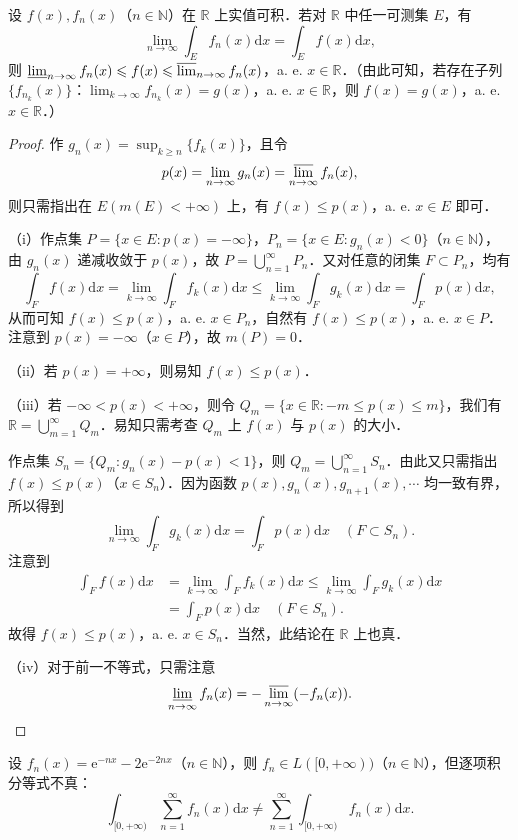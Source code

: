 \documentclass[../../main.tex]{subfiles}
\begin{document}
\begin{example}
设 \( f(x), f_n(x) \)（\( n \in \mathbb{N} \)）在 \( \mathbb{R} \) 上实值可积．若对 \( \mathbb{R} \) 中任一可测集 \( E \)，有
\[
\lim_{n \to \infty} \int_E f_n(x) \mathrm{d}x = \int_E f(x) \mathrm{d}x,
\]
则 \( \varliminf_{n \to \infty} f_n(x) \leqslant f(x) \leqslant \varlimsup_{n \to \infty} f_n(x) \)，a. e. \( x \in \mathbb{R} \)．（由此可知，若存在子列 \( \{ f_{n_k}(x) \} \)：\( \lim_{k \to \infty} f_{n_k}(x) = g(x) \)，a. e. \( x \in \mathbb{R} \)，则 \( f(x) = g(x) \)，a. e. \( x \in \mathbb{R} \)．）
\end{example}
\begin{proof}
作 \( g_n(x) = \sup_{k \geqslant n} \{ f_k(x) \} \)，且令
\[
p(x) = \lim_{n \to \infty} g_n(x) = \varlimsup_{n \to \infty} f_n(x),
\]
则只需指出在 \( E(m(E) < +\infty) \) 上，有 \( f(x) \leqslant p(x) \)，a. e. \( x \in E \) 即可．

（i）作点集 \( P = \{ x \in E : p(x) = -\infty \} \)，\( P_n = \{ x \in E : g_n(x) < 0 \} \)（\( n \in \mathbb{N} \)），由 \( g_n(x) \) 递减收敛于 \( p(x) \)，故 \( P = \bigcup_{n=1}^{\infty} P_n \)．又对任意的闭集 \( F \subset P_n \)，均有
\[
\int_F f(x) \mathrm{d}x = \lim_{k \to \infty} \int_F f_k(x) \mathrm{d}x \leqslant \lim_{k \to \infty} \int_F g_k(x) \mathrm{d}x = \int_F p(x) \mathrm{d}x,
\]
从而可知 \( f(x) \leqslant p(x) \)，a. e. \( x \in P_n \)，自然有 \( f(x) \leqslant p(x) \)，a. e. \( x \in P \)．注意到 \( p(x) = -\infty \)（\( x \in P \)），故 \( m(P) = 0 \)．

（ii）若 \( p(x) = +\infty \)，则易知 \( f(x) \leqslant p(x) \)．

（iii）若 \( -\infty < p(x) < +\infty \)，则令 \( Q_m = \{ x \in \mathbb{R} : -m \leqslant p(x) \leqslant m \} \)，我们有 \( \mathbb{R} = \bigcup_{m=1}^{\infty} Q_m \)．易知只需考查 \( Q_m \) 上 \( f(x) \) 与 \( p(x) \) 的大小．

作点集 \( S_n = \{ Q_m : g_n(x) - p(x) < 1 \} \)，则 \( Q_m = \bigcup_{n=1}^{\infty} S_n \)．由此又只需指出 \( f(x) \leqslant p(x) \)（\( x \in S_n \)）．因为函数 \( p(x), g_n(x), g_{n+1}(x), \cdots \) 均一致有界，所以得到
\[
\lim_{n \to \infty} \int_F g_k(x) \mathrm{d}x = \int_F p(x) \mathrm{d}x \quad (F \subset S_n).
\]
注意到
\begin{align*}
\int_F f(x) \mathrm{d}x &= \lim_{k \to \infty} \int_F f_k(x) \mathrm{d}x \leqslant \lim_{k \to \infty} \int_F g_k(x) \mathrm{d}x \\
&= \int_F p(x) \mathrm{d}x \quad (F \in S_n).
\end{align*}
故得 \( f(x) \leqslant p(x) \)，a. e. \( x \in S_n \)．当然，此结论在 \( \mathbb{R} \) 上也真．

（iv）对于前一不等式，只需注意
\[
\varliminf_{n \to \infty} f_n(x) = -\varlimsup_{n \to \infty} (-f_n(x)).
\]

\end{proof}
\begin{remark}
设 \( f_n(x) = \mathrm{e}^{-nx} - 2\mathrm{e}^{-2nx} \)（\( n \in \mathbb{N} \)），则 \( f_n \in L([0, +\infty)) \)（\( n \in \mathbb{N} \)），但逐项积分等式不真：
\[
\int_{[0, +\infty)} \sum_{n=1}^{\infty} f_n(x) \mathrm{d}x \neq \sum_{n=1}^{\infty} \int_{[0, +\infty)} f_n(x) \mathrm{d}x.
\]
\end{remark}
\end{document}
